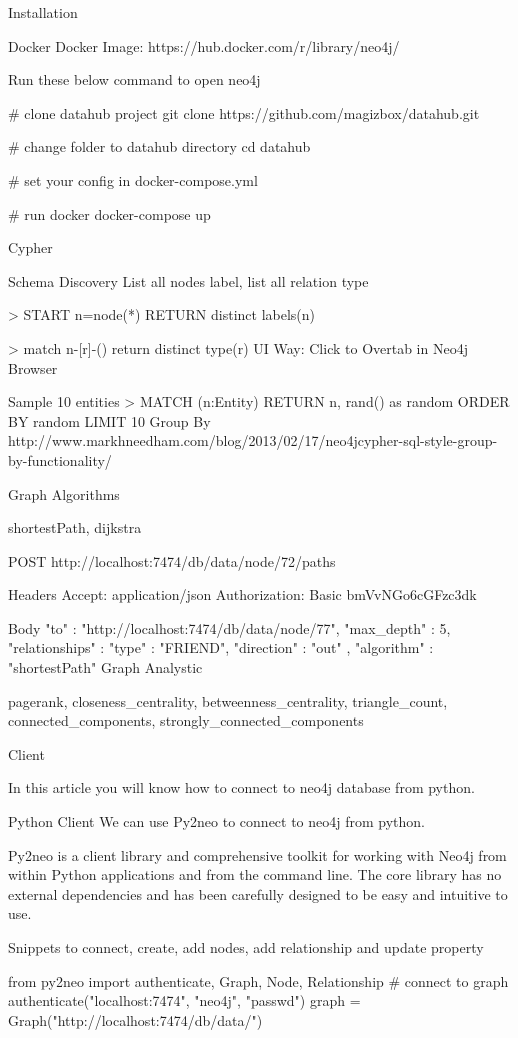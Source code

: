 {Installation

Docker
Docker Image: https://hub.docker.com/r/library/neo4j/

Run these below command to open neo4j

# clone datahub project
git clone https://github.com/magizbox/datahub.git

# change folder to datahub directory
cd datahub

# set your config in docker-compose.yml

# run docker
docker-compose up

Cypher

Schema Discovery
List all nodes label, list all relation type

> START n=node(*) RETURN distinct labels(n)

> match n-[r]-() return distinct type(r)
UI Way: Click to Overtab in Neo4j Browser

Sample 10 entities
> MATCH (n:Entity) RETURN n, rand() as random ORDER BY random LIMIT 10
Group By
http://www.markhneedham.com/blog/2013/02/17/neo4jcypher-sql-style-group-by-functionality/

Graph Algorithms

shortestPath, dijkstra

POST http://localhost:7474/db/data/node/72/paths

Headers
Accept: application/json
Authorization: Basic bmVvNGo6cGFzc3dk

Body
{
  "to" : "http://localhost:7474/db/data/node/77",
  "max_depth" : 5,
  "relationships" : {
    "type" : "FRIEND",
    "direction" : "out"
  },
  "algorithm" : "shortestPath"
}
Graph Analystic

pagerank, closeness_centrality, betweenness_centrality, triangle_count, connected_components, strongly_connected_components

Client

In this article you will know how to connect to neo4j database from python.

Python Client
We can use Py2neo to connect to neo4j from python.

Py2neo is a client library and comprehensive toolkit for working with Neo4j from within Python applications and from the command line. The core library has no external dependencies and has been carefully designed to be easy and intuitive to use.

Snippets to connect, create, add nodes, add relationship and update property

from py2neo import authenticate, Graph, Node, Relationship
# connect to graph
authenticate("localhost:7474", "neo4j", "passwd")
graph = Graph("http://localhost:7474/db/data/")

}
